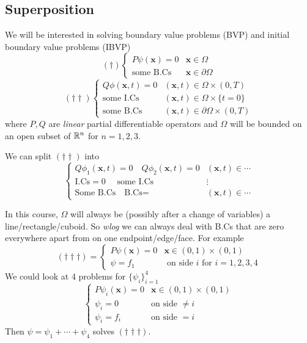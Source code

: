 \documentclass{article}
\begin{document}
\subsection{Superposition}
We will be interested in solving boundary value problems (BVP) and initial boundary value problems (IBVP)
\[
	(\dagger) \begin{cases}
	  P\psi(\mathbf x)=0&\mathbf x\in\Omega\\
	  \text{some B.Cs} & \mathbf x\in\partial\Omega
  \end{cases}
\]
\[
	(\dagger\dagger) \begin{cases}
		Q\phi(\mathbf x,t)=0&(\mathbf x,t)\in \Omega\times (0,T)\\
		\text{some I.Cs} & (\mathbf x,t)\in \Omega\times\{t=0\}\\
		\text{some B.Cs} & (\mathbf x,t)\in\partial\Omega\times (0,T)
	\end{cases}
\]
where $ P,Q $ are \textit{linear} partial differentiable operators and $ \Omega $ will be bounded on an open subset of $ \mathbb{R}^n $ for $ n=1,2,3 $.
\begin{remark}
  We can split $ (\dagger\dagger) $ into
  \[
    \begin{cases}
	    Q\phi_1(\mathbf x,t)=0 \quad Q\phi_2(\mathbf x,t)=0 & (\mathbf x,t)\in\cdots \\
	    \text{I.Cs} =0 \quad \text{ some I.Cs} & \vdots \\
	    \text{Some B.Cs} \quad \text{B.Cs} = & (\mathbf x,t)\in \cdots 
    \end{cases}
  \]
\end{remark}
In this course, $ \Omega $ will always be (possibly after a change of variables) a line/rectangle/cuboid. So \textit{wlog} we can always deal with B.Cs that are zero everywhere apart from on one endpoint/edge/face. For example
\[
	(\dagger\dagger\dagger)=\begin{cases}
		P\psi(\mathbf x)=0& \mathbf x\in (0,1)\times (0,1) \\
		\psi = f_1 & \text{ on side }i\text{ for } i = 1,2,3,4
	\end{cases}
\]
We could look at 4 problems for $ \{\psi_i\}_{i=1}^4 $
\[
  \begin{cases}
	  P\psi_i(\mathbf x)=0 & \mathbf x\in (0,1)\times (0,1) \\
	  \psi_i=0 & \text{on side } \ne i \\
	  \psi_i=f_i & \text{on side } = i
  \end{cases}
\]
Then $ \psi=\psi_1+\cdots+\psi_4 $ solves $ (\dagger\dagger\dagger) $.
\end{document}
